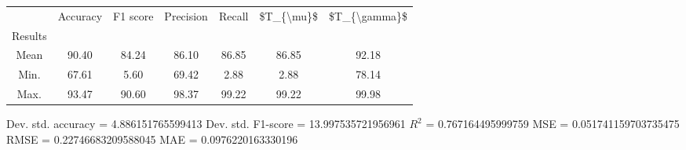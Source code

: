\begin{tabular}{|c|c|c|c|c|c|c|}
\toprule
{} &  Accuracy &  F1 score &  Precision &  Recall &  \$T\_\{\textbackslash mu\}\$ &  \$T\_\{\textbackslash gamma\}\$ \\
Results &           &           &            &         &            &               \\
\hline
Mean    &     90.40 &     84.24 &      86.10 &   86.85 &      86.85 &         92.18 \\
Min.    &     67.61 &      5.60 &      69.42 &    2.88 &       2.88 &         78.14 \\
Max.    &     93.47 &     90.60 &      98.37 &   99.22 &      99.22 &         99.98 \\
\bottomrule
\end{tabular}

 Dev. std. accuracy = 4.886151765599413
 Dev. std. F1-score = 13.997535721956961
 $R^2$ = 0.767164495999759
 MSE = 0.051741159703735475
 RMSE = 0.22746683209588045
 MAE = 0.0976220163330196